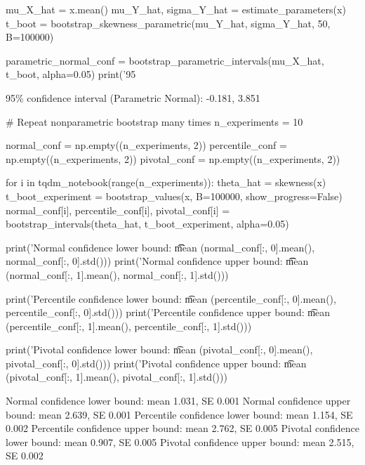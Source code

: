 \begin{python}
mu_X_hat = x.mean()
mu_Y_hat, sigma_Y_hat = estimate_parameters(x)
t_boot = bootstrap_skewness_parametric(mu_Y_hat, sigma_Y_hat, 50, B=100000)

parametric_{n}ormal_conf = bootstrap_parametric_{i}ntervals(mu_X_hat, t_boot, alpha=0.05)
print('95%
\end{python}

\begin{console}
95\% confidence interval (Parametric Normal):     -0.181, 3.851
\end{console}

\begin{python}
# Repeat nonparametric bootstrap many times
n_experiments = 10

normal_conf = np.empty((n_experiments, 2))
percentile_conf = np.empty((n_experiments, 2))
pivotal_conf = np.empty((n_experiments, 2))

for i in tqdm_{n}otebook(range(n_experiments)):
    theta_hat = skewness(x)
    t_boot_experiment = bootstrap_values(x, B=100000, show_progress=False)
    normal_conf[i], percentile_conf[i], 
                    pivotal_conf[i] = bootstrap_{i}ntervals(theta_hat, t_boot_experiment, alpha=0.05)
\end{python}

\begin{python}
print('Normal confidence lower bound: \t\t mean %
      (normal_conf[:, 0].mean(), normal_conf[:, 0].std()))
print('Normal confidence upper bound: \t\t mean %
      (normal_conf[:, 1].mean(), normal_conf[:, 1].std()))

print('Percentile confidence lower bound: \t mean %
      (percentile_conf[:, 0].mean(), percentile_conf[:, 0].std()))
print('Percentile confidence upper bound: \t mean %
      (percentile_conf[:, 1].mean(), percentile_conf[:, 1].std()))

print('Pivotal confidence lower bound: \t mean %
      (pivotal_conf[:, 0].mean(), pivotal_conf[:, 0].std()))
print('Pivotal confidence upper bound: \t mean %
      (pivotal_conf[:, 1].mean(), pivotal_conf[:, 1].std()))
\end{python}

\begin{console}
Normal confidence lower bound:           mean 1.031, SE 0.001
Normal confidence upper bound:           mean 2.639, SE 0.001
Percentile confidence lower bound:       mean 1.154, SE 0.002
Percentile confidence upper bound:       mean 2.762, SE 0.005
Pivotal confidence lower bound:          mean 0.907, SE 0.005
Pivotal confidence upper bound:          mean 2.515, SE 0.002
\end{console}

